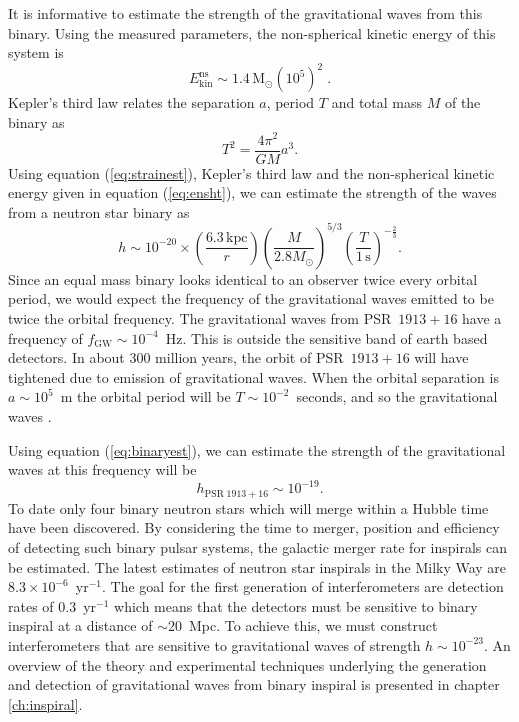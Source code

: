 It is informative to estimate the strength of the gravitational waves from
this binary. Using the measured parameters, the non-spherical kinetic energy
of this system is 
\begin{equation}
E_\mathrm{kin}^\mathrm{ns} \sim 
1.4\,\mathrm{M}_\odot (10^5)^2 \; .
\label{eq:ensht}
\end{equation}
Kepler's third law relates the separation $a$, period $T$ and total mass $M$
of the binary as
\begin{equation}
T^2 = \frac{4\pi^2}{GM}a^3.
\label{eq:kep3}
\end{equation}
Using equation (\ref{eq:strainest}), Kepler's third law and the non-spherical
kinetic energy given in equation (\ref{eq:ensht}), we can estimate the 
strength of the waves from a neutron star binary as
\begin{equation}
h \sim 10^{-20} \times 
\left(\frac{6.3\,\mathrm{kpc}}{r}\right)
\left(\frac{M}{2.8M_\odot}\right)^{5/3}
\left(\frac{T}{1\,\mathrm{s}}\right)^{-\frac{2}{3}}.
\label{eq:binaryest}
\end{equation}
Since an equal mass binary looks identical to an observer twice every orbital
period, we would expect the frequency of the gravitational waves emitted to be
twice the orbital frequency. The gravitational waves from PSR~$1913+16$ have a
frequency of $f_\mathrm{GW} \sim 10^{-4}$~Hz.  This is outside the sensitive
band of earth based detectors.   In about 300 million years,  the
orbit of PSR~$1913+16$ will have
tightened due to emission of gravitational waves.  When the orbital separation
is $a \sim 10^5$~m the orbital period will be $T\sim10^{-2}$~seconds, and so
the gravitational waves . 



Using equation (\ref{eq:binaryest}), we
can estimate the strength of the gravitational waves at this frequency
will be
\begin{equation}
h_{\mathrm{PSR}\;1913+16} \sim 10^{-19}.
\label{eq:hbns}
\end{equation}
To date only four binary neutron stars which will merge within a Hubble time
have been discovered.  By considering the time to merger, position and
efficiency of detecting such binary pulsar systems, the galactic merger rate
for inspirals can be estimated\cite{Phinney:1991ei}.  The latest estimates of
neutron star inspirals in the Milky Way are $8.3 \times 10^{-6}$~yr$^{-1}$. The
goal for the first generation of interferometers are detection rates of
$0.3$~yr$^{-1}$ which means that the detectors must be sensitive to binary
inspiral at a distance of $\sim 20$~Mpc. To achieve this, we must construct
interferometers that are sensitive to gravitational waves of strength $h \sim
10^{-23}$. An overview of the theory and experimental techniques underlying
the generation and detection of gravitational waves from binary inspiral is
presented in chapter \ref{ch:inspiral}.

